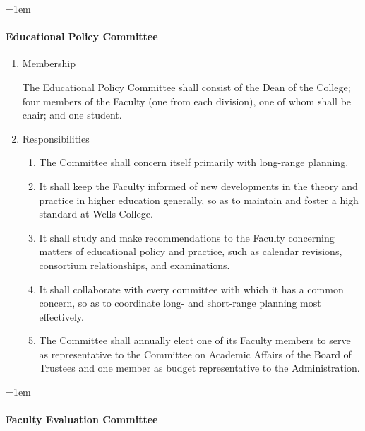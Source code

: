 \documentclass{manual}
\let\oldparagraph\paragraph
\renewcommand\paragraph{\leftskip=1em\oldparagraph}
\newcommand{\itemLevelA}{\alph*.}
\newcommand{\itemLevelB}{\arabic*)}
\newcommand{\itemRefA}{\alph*}
\newcommand{\itemRefB}{\arabic*}
\begin{document}
\paragraph{Educational Policy Committee}

	\begin{enumerate}[label=\itemLevelA,ref=\itemRefA]
	\item Membership

		The Educational Policy Committee shall consist of the Dean of the College; four members of the Faculty (one from each division), one of whom shall be chair; and one student.

	\item Responsibilities

		\begin{enumerate}[label=\itemLevelB,ref=\itemRefB]
		\item The Committee shall concern itself primarily with long-range planning.
		\item It shall keep the Faculty informed of new developments in the theory and practice in higher education generally, so as to maintain and foster a high standard at Wells College.
		\item It shall study and make recommendations to the Faculty concerning matters of educational policy and practice, such as calendar revisions, consortium relationships, and examinations.
		\item It shall collaborate with every committee with which it has a common concern, so as to coordinate long- and short-range planning most effectively.
		\item The Committee shall annually elect one of its Faculty members to serve as representative to the Committee on Academic Affairs of the Board of Trustees and one member as budget representative to the Administration.
		\end{enumerate}
	
	\end{enumerate}

\paragraph{Faculty Evaluation Committee}\label{par:FacultyEvaluationCommittee}
\end{document}
